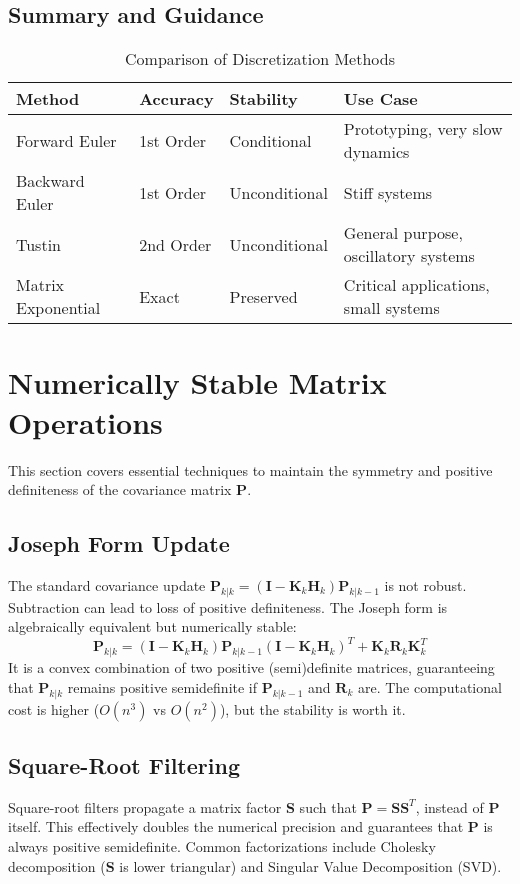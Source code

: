 \documentclass[11pt]{article}
\begin{document}
\subsection{Summary and Guidance}
\begin{table}[H]
\centering
\caption{Comparison of Discretization Methods}
\label{tab:discretization}
\begin{tabular}{p{3cm} p{3cm} p{3cm} p{3cm}}
\toprule
\textbf{Method} & \textbf{Accuracy} & \textbf{Stability} & \textbf{Use Case} \\
\midrule
Forward Euler & 1st Order & Conditional & Prototyping, very slow dynamics \\
Backward Euler & 1st Order & Unconditional & Stiff systems \\
Tustin & 2nd Order & Unconditional & General purpose, oscillatory systems \\
Matrix Exponential & Exact & Preserved & Critical applications, small systems \\
\bottomrule
\end{tabular}
\end{table}

\section{Numerically Stable Matrix Operations}
\label{sec:matrix_tricks}
This section covers essential techniques to maintain the symmetry and positive definiteness of the covariance matrix $\bm{P}$.

\subsection{Joseph Form Update}
The standard covariance update $\bm{P}_{k|k} = (\bm{I} - \bm{K}_k \bm{H}_k) \bm{P}_{k|k-1}$ is not robust. Subtraction can lead to loss of positive definiteness. The Joseph form is algebraically equivalent but numerically stable:
\begin{equation}
\bm{P}_{k|k} = (\bm{I} - \bm{K}_k \bm{H}_k) \bm{P}_{k|k-1} (\bm{I} - \bm{K}_k \bm{H}_k)^T + \bm{K}_k \bm{R}_k \bm{K}_k^T
\label{eq:joseph}
\end{equation}
It is a convex combination of two positive (semi)definite matrices, guaranteeing that $\bm{P}_{k|k}$ remains positive semidefinite if $\bm{P}_{k|k-1}$ and $\bm{R}_k$ are. The computational cost is higher ($O(n^3)$ vs $O(n^2)$), but the stability is worth it.

\subsection{Square-Root Filtering}
Square-root filters propagate a matrix factor $\bm{S}$ such that $\bm{P} = \bm{S} \bm{S}^T$, instead of $\bm{P}$ itself. This effectively doubles the numerical precision and guarantees that $\bm{P}$ is always positive semidefinite. Common factorizations include Cholesky decomposition ($\bm{S}$ is lower triangular) and Singular Value Decomposition (SVD).
\end{document}

